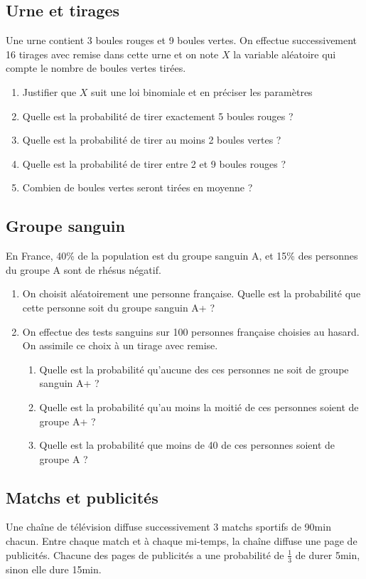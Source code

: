 \documentclass[oneside,12pt]{article}          %
\begin{document}
\subsection{Urne et tirages}
Une urne contient 3 boules rouges et 9 boules vertes. On effectue successivement 16 tirages avec remise dans cette urne et on note $X$ la variable aléatoire qui compte le nombre de boules vertes tirées.
\begin{enumerate}
    \item Justifier que $X$ suit une loi binomiale et en préciser les paramètres
    \item Quelle est la probabilité de tirer exactement 5 boules rouges ?
    \item Quelle est la probabilité de tirer au moins 2 boules vertes ?
    \item Quelle est la probabilité de tirer entre 2 et 9 boules rouges ?
    \item Combien de boules vertes seront tirées en moyenne ?
\end{enumerate}



\subsection{Groupe sanguin}
En France, 40\% de la population est du groupe sanguin A, et 15\% des personnes du groupe A sont de rhésus négatif.
\begin{enumerate}
    \item On choisit aléatoirement une personne française. Quelle est la probabilité que cette personne soit du groupe sanguin A+ ?
    \item On effectue des tests sanguins sur 100 personnes française choisies au hasard. On assimile ce choix à  un tirage avec remise.
    \begin{enumerate}
        \item Quelle est la probabilité qu'aucune des ces personnes ne soit de groupe sanguin A+ ?
        \item Quelle est la probabilité qu'au moins la moitié de ces personnes soient de groupe A+ ?
        \item Quelle est la probabilité que moins de 40 de ces personnes soient de groupe A ?
    \end{enumerate}
\end{enumerate}



\subsection{Matchs et publicités}
Une chaîne de télévision diffuse successivement 3 matchs sportifs de 90min chacun. Entre chaque match et à chaque mi-temps, la chaîne diffuse une page de publicités. Chacune des pages de publicités a une probabilité de $\frac{1}{3}$ de durer 5min, sinon elle dure 15min.
\end{document}
